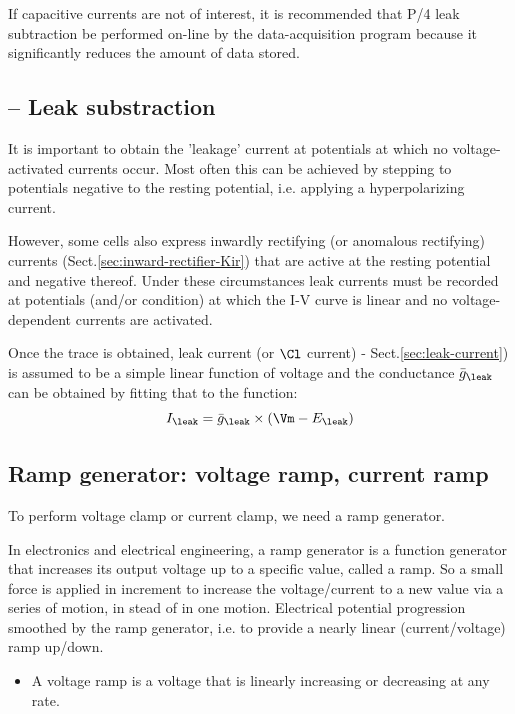 If capacitive currents are not of interest, it is recommended that P/4 leak
subtraction be performed on-line by the data-acquisition program because it
significantly reduces the amount of data stored.

\subsection{-- Leak substraction}
\label{sec:leak-current-subtraction}

It is important to obtain the 'leakage' current at potentials at which no
voltage-activated currents occur. Most often this can be achieved by stepping to
potentials negative to the resting potential, i.e. applying a hyperpolarizing
current.

However, some cells also express inwardly rectifying (or anomalous rectifying)
currents (Sect.\ref{sec:inward-rectifier-Kir}) that are active at the resting
potential and negative thereof. Under these circumstances leak currents must be
recorded at potentials (and/or condition) at which the I-V curve is linear and
no voltage-dependent currents are activated.

Once the trace is obtained, leak current (or $\Cl$ current) -
Sect.\ref{sec:leak-current}) is assumed to be a simple linear function of
voltage and the conductance $\bar{g}_\leak$ can be obtained by fitting that to
the function:
\begin{equation}
I_\leak = \bar{g}_\leak \times (\Vm - E_\leak)
\end{equation}

\subsection{Ramp generator: voltage ramp, current ramp}
\label{sec:voltage-ramp}

To perform voltage clamp or current clamp, we need a ramp generator.

In electronics and electrical engineering, a ramp generator is a function
generator that increases its output voltage up to a specific value, called a
ramp. So a small force is applied in increment to increase the voltage/current
to a new value via a series of motion, in stead of in one motion. Electrical
potential progression smoothed by the ramp generator, i.e.
to provide a nearly linear (current/voltage) ramp up/down.
\begin{itemize}
  \item A voltage ramp  is a voltage that is linearly increasing or decreasing
  at any rate.
\end{itemize}

